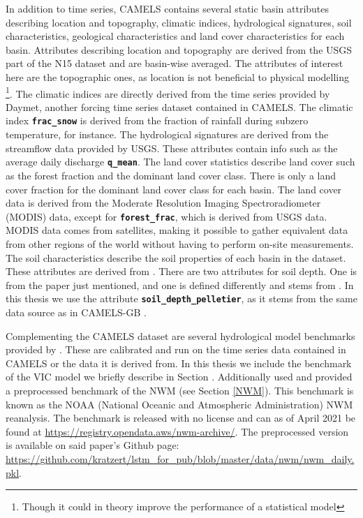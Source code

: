 In addition to time series, CAMELS contains several static basin attributes describing 
location and topography, climatic indices, hydrological signatures, soil characteristics, geological 
characteristics and land cover characteristics for each basin.
Attributes describing location and topography are derived from the USGS part of 
the N15 dataset and are basin-wise averaged. The attributes of interest here are the topographic ones, as 
location is not beneficial to physical modelling \footnote{Though it could in theory 
improve the performance of a statistical model}.
The climatic indices are directly derived from the time series provided by Daymet, 
another forcing time series dataset contained in CAMELS. The climatic index
\textbf{\texttt{frac\_snow}} is derived from the fraction of rainfall during 
subzero temperature, for instance. 
The hydrological signatures are derived from the streamflow data provided by 
USGS. These attributes contain info such as the average daily discharge 
\textbf{\texttt{q\_mean}}.
The land cover statistics describe land cover such as the forest fraction and 
the dominant land cover class. There is only a land cover fraction for the dominant 
land cover class for each basin. The land cover data is derived from the 
Moderate Resolution Imaging Spectroradiometer (MODIS) data, 
except for \textbf{\texttt{forest\_frac}}, which is derived from USGS data. MODIS 
data comes from satellites, making it possible to gather equivalent data from 
other regions of the world without having to perform on-site measurements.
The soil characteristics describe the soil properties of each basin in the 
dataset. These attributes are derived from \citet{SoilData}. There are two 
attributes for soil depth. One is from the paper just mentioned, and one is defined 
differently and stems from \citet{pelletier}. In this thesis we use the attribute 
\textbf{\texttt{soil\_depth\_pelletier}}, as it stems from the same data source as 
in CAMELS-GB \citep{CAMELS_GB}.

Complementing the CAMELS dataset are several hydrological model benchmarks provided 
by \citet{CAMELS_hydroshare}. 
These are calibrated and run on the time series data contained in CAMELS or the data 
it is derived from. In this thesis we include the benchmark of the VIC model we 
briefly describe in Section \cite{VIC}. Additionally \citet{lstm_third_paper} used 
and provided a preprocessed  benchmark of the NWM (see Section \ref{NWM}). 
This benchmark is known as the 
NOAA (National Oceanic and Atmospheric Administration) NWM reanalysis. The benchmark 
is released with no license and can as of April 2021  be found at 
\url{https://registry.opendata.aws/nwm-archive/}.
The preprocessed version is available on said paper's 
Github page: \url{https://github.com/kratzert/lstm_for_pub/blob/master/data/nwm/nwm_daily.pkl}.



